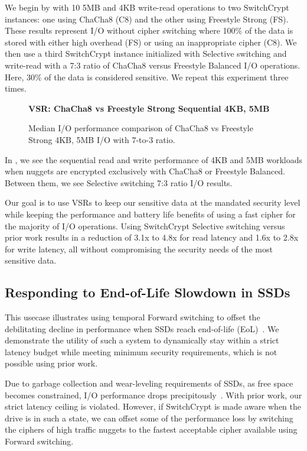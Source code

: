 We begin by with 10 5MB and 4KB write-read operations to two
SwitchCrypt instances: one using ChaCha8 (C8) and the other using Freestyle
Strong (FS). These results represent I/O without cipher switching where 100\% of
the data is stored with either high overhead (FS) or using an inappropriate
cipher (C8). We then use a third SwitchCrypt instance initialized with Selective
switching and write-read with a 7:3 ratio of ChaCha8 versus Freestyle
Balanced I/O operations. Here, 30\% of the data is considered sensitive. We
repeat this experiment three times.

\begin{figure}[ht] \textbf{VSR: ChaCha8 vs Freestyle Strong Sequential
4KB, 5MB}\par\medskip
   \centering
   {} \caption{Median I/O performance comparison
   of ChaCha8 vs Freestyle Strong 4KB, 5MB I/O with 7-to-3 ratio.}
  \label{fig:usecase-vsr-bar}
\end{figure}

In , we see the sequential read and write performance of
4KB and 5MB workloads when nuggets are encrypted exclusively with ChaCha8 or
Freestyle Balanced. Between them, we see Selective switching 7:3 ratio I/O
results.

Our goal is to use VSRs to keep our sensitive data at the mandated security
level while keeping the performance and battery life benefits of using a fast
cipher for the majority of I/O operations. Using SwitchCrypt Selective switching
versus prior work results in a reduction of 3.1x to 4.8x for read latency and
1.6x to 2.8x for write latency, all without compromising the security needs of
the most sensitive data.

\subsection{Responding to End-of-Life Slowdown in SSDs} \label{subsec:uc3}

This usecase illustrates using temporal Forward switching to offset the
debilitating decline in performance when SSDs reach end-of-life
(EoL)~\cite{SSDEOL1}. We demonstrate the utility of such a system to dynamically
stay within a strict latency budget while meeting minimum security requirements,
which is not possible using prior work.

Due to garbage collection and wear-leveling requirements of SSDs, as free space
becomes constrained, I/O performance drops precipitously~\cite{SSDEOL1}. With
prior work, our strict latency ceiling is violated. However, if SwitchCrypt is
made aware when the drive is in such a state, we can offset some of the
performance loss by switching the ciphers of high traffic nuggets to the fastest
acceptable cipher available using Forward switching.

